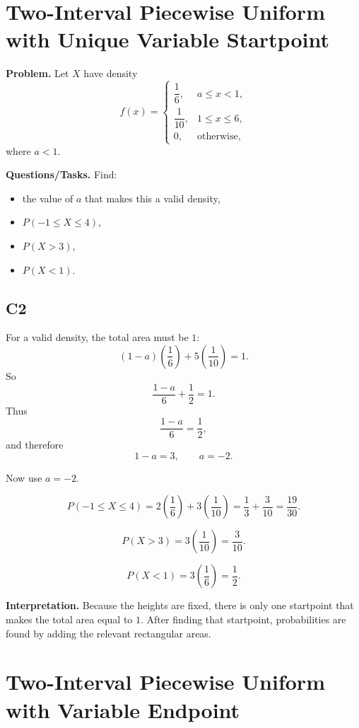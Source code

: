 
\section{Two-Interval Piecewise Uniform with Unique Variable Startpoint}

\textbf{Problem.}
Let $X$ have density
\[
f(x)=
\begin{cases}
	\dfrac{1}{6}, & a\le x<1,\\[4pt]
	\dfrac{1}{10}, & 1\le x\le 6,\\[4pt]
	0, & \text{otherwise,}
\end{cases}
\]
where $a<1$.

\textbf{Questions/Tasks.}
Find:
\begin{itemize}
	\item[(a)] the value of $a$ that makes this a valid density,
	\item[(b)] $P(-1\le X\le 4)$,
	\item[(c)] $P(X>3)$,
	\item[(d)] $P(X<1)$.
\end{itemize}

\subsection*{C2}
For a valid density, the total area must be $1$:
\[
(1-a)\left(\frac{1}{6}\right)+5\left(\frac{1}{10}\right)=1.
\]
So
\[
\frac{1-a}{6}+\frac{1}{2}=1.
\]
Thus
\[
\frac{1-a}{6}=\frac{1}{2},
\]
and therefore
\[
1-a=3,
\qquad
a=-2.
\]

Now use $a=-2$.

\[
P(-1\le X\le 4)=2\left(\frac{1}{6}\right)+3\left(\frac{1}{10}\right)
=\frac{1}{3}+\frac{3}{10}
=\frac{19}{30}.
\]

\[
P(X>3)=3\left(\frac{1}{10}\right)=\frac{3}{10}.
\]

\[
P(X<1)=3\left(\frac{1}{6}\right)=\frac{1}{2}.
\]


\textbf{Interpretation.}
Because the heights are fixed, there is only one startpoint that makes the total area equal to $1$. After finding that startpoint, probabilities are found by adding the relevant rectangular areas.

\section{Two-Interval Piecewise Uniform with Variable Endpoint}

